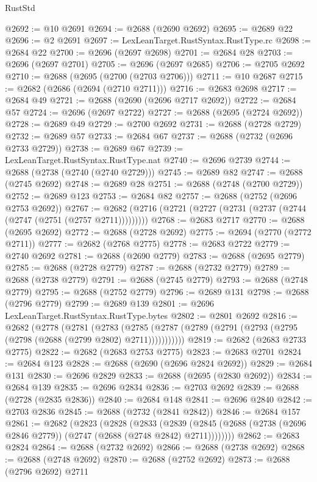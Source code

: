 \begin{lexlean}{RustStd}
\begin{coremodule}
@2692 := @10 @2691
@2694 := @2688 (@2690 @2692)
@2695 := @2689 @22
@2696 := @2 @2691
@2697 := LexLeanTarget.RustSyntax.RustType.rc
@2698 := @2684 @22
@2700 := @2696 (@2697 @2698)
@2701 := @2684 @28
@2703 := @2696 (@2697 @2701)
@2705 := @2696 (@2697 @2685)
@2706 := @2705 @2692
@2710 := @2688 (@2695 (@2700 (@2703 @2706)))
@2711 := @10 @2687
@2715 := @2682 (@2686 (@2694 (@2710 @2711)))
@2716 := @2683 @2698
@2717 := @2684 @49
@2721 := @2688 (@2690 (@2696 @2717 @2692))
@2722 := @2684 @57
@2724 := @2696 (@2697 @2722)
@2727 := @2688 (@2695 (@2724 @2692))
@2728 := @2689 @49
@2729 := @2700 @2692
@2731 := @2688 (@2728 @2729)
@2732 := @2689 @57
@2733 := @2684 @67
@2737 := @2688 (@2732 (@2696 @2733 @2729))
@2738 := @2689 @67
@2739 := LexLeanTarget.RustSyntax.RustType.nat
@2740 := @2696 @2739
@2744 := @2688 (@2738 (@2740 (@2740 @2729)))
@2745 := @2689 @82
@2747 := @2688 (@2745 @2692)
@2748 := @2689 @28
@2751 := @2688 (@2748 (@2700 @2729))
@2752 := @2689 @123
@2753 := @2684 @82
@2757 := @2688 (@2752 (@2696 @2753 @2692))
@2767 := @2682 (@2716 (@2721 (@2727 (@2731 (@2737 (@2744 (@2747 (@2751 (@2757 @2711)))))))))
@2768 := @2683 @2717
@2770 := @2688 (@2695 @2692)
@2772 := @2688 (@2728 @2692)
@2775 := @2694 (@2770 (@2772 @2711))
@2777 := @2682 (@2768 @2775)
@2778 := @2683 @2722
@2779 := @2740 @2692
@2781 := @2688 (@2690 @2779)
@2783 := @2688 (@2695 @2779)
@2785 := @2688 (@2728 @2779)
@2787 := @2688 (@2732 @2779)
@2789 := @2688 (@2738 @2779)
@2791 := @2688 (@2745 @2779)
@2793 := @2688 (@2748 @2779)
@2795 := @2688 (@2752 @2779)
@2796 := @2689 @131
@2798 := @2688 (@2796 @2779)
@2799 := @2689 @139
@2801 := @2696 LexLeanTarget.RustSyntax.RustType.bytes
@2802 := @2801 @2692
@2816 := @2682
    (@2778
      (@2781
        (@2783
          (@2785 (@2787 (@2789 (@2791 (@2793 (@2795 (@2798 (@2688 (@2799 @2802) @2711)))))))))))
@2819 := @2682 (@2683 @2733 @2775)
@2822 := @2682 (@2683 @2753 @2775)
@2823 := @2683 @2701
@2824 := @2684 @123
@2828 := @2688 (@2690 (@2696 @2824 @2692))
@2829 := @2684 @131
@2830 := @2696 @2829
@2833 := @2688 (@2695 (@2830 @2692))
@2834 := @2684 @139
@2835 := @2696 @2834
@2836 := @2703 @2692
@2839 := @2688 (@2728 (@2835 @2836))
@2840 := @2684 @148
@2841 := @2696 @2840
@2842 := @2703 @2836
@2845 := @2688 (@2732 (@2841 @2842))
@2846 := @2684 @157
@2861 := @2682
    (@2823
      (@2828
        (@2833
          (@2839 (@2845 (@2688 (@2738 (@2696 @2846 @2779)) (@2747 (@2688 (@2748 @2842) @2711))))))))
@2862 := @2683 @2824
@2864 := @2688 (@2732 @2692)
@2866 := @2688 (@2738 @2692)
@2868 := @2688 (@2748 @2692)
@2870 := @2688 (@2752 @2692)
@2873 := @2688 (@2796 @2692) @2711

\end{coremodule}
\end{lexlean}
